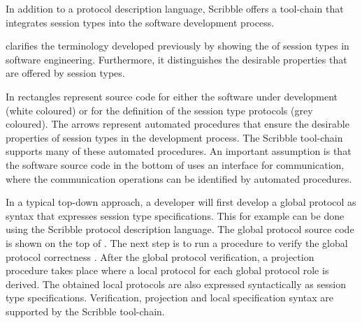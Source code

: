 In addition to a protocol description language,
Scribble offers a tool-chain that 
integrates session types into the software
development process.





 clarifies the terminology
developed previously by showing the
 of session types in software
engineering.
Furthermore, it distinguishes
the desirable properties that are offered by 
session types.

In  rectangles
represent source code for either the software
under development (white coloured) or for the definition
of the session type protocols (grey coloured). 
The arrows
represent automated procedures that ensure
the desirable properties of session types
in the development process. The Scribble
tool-chain supports many of these automated
procedures.
An important assumption
is that the software source code in the
bottom of  uses an interface
for communication, where the communication
operations can be identified by automated
procedures.

In a typical top-down approach, a developer will first develop a global protocol
as syntax that expresses session type specifications.
This for example can be done
using the Scribble protocol description language.
The global protocol source code is shown
on the top of .
The next step is to run a procedure to verify the 
global protocol correctness .
After the global protocol verification, a projection
procedure takes place where a local protocol
for each global protocol role is derived.
The obtained local protocols are also expressed
syntactically as session type specifications.
Verification, projection and local specification
syntax are supported by the Scribble tool-chain.

